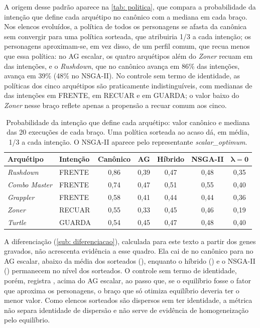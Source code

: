 A origem desse padrão aparece na \autoref{tab: politica}, que compara a probabilidade da intenção que define cada arquétipo no canônico com a mediana em cada braço. Nos elencos evoluídos, a política de todos os personagens se afasta da canônica sem convergir para uma política sorteada, que atribuiria 1/3 a cada intenção; os personagens aproximam-se, em vez disso, de um perfil comum, que recua menos que essa política: no AG escalar, os quatro arquétipos além do \textit{Zoner} recuam em \polAGRecuoOutros{} das intenções, e o \textit{Rushdown}, que no canônico avança em 86\% das intenções, avança em 39\% (48\% no NSGA-II). No controle sem termo de identidade, as políticas dos cinco arquétipos são praticamente indistinguíveis, com medianas de \polLzeroF{} das intenções em FRENTE, \polLzeroR{} em RECUAR e \polLzeroG{} em GUARDA; o valor baixo do \textit{Zoner} nesse braço reflete apenas a propensão a recuar comum aos cinco.

\begin{table}[htb]
    \caption[Probabilidade da intenção que define cada arquétipo]{Probabilidade da intenção que define cada arquétipo: valor canônico e mediana das 20 execuções de cada braço. Uma política sorteada ao acaso dá, em média, 1/3 a cada intenção. O NSGA-II aparece pelo representante \textit{scalar\_optimum}.}
    \label{tab: politica}
    \centering
    \small
    \begin{tabular}{l l c c c c c}
        \toprule
        \textbf{Arquétipo} & \textbf{Intenção} & \textbf{Canônico} & \textbf{AG} & \textbf{Híbrido} & \textbf{NSGA-II} & $\boldsymbol{\lambda = 0}$ \\
        \midrule
        \textit{Rushdown}     & FRENTE & 0,86 & 0,39 & 0,47 & 0,48 & 0,35 \\
        \textit{Combo Master} & FRENTE & 0,74 & 0,47 & 0,51 & 0,55 & 0,40 \\
        \textit{Grappler}     & FRENTE & 0,58 & 0,41 & 0,44 & 0,44 & 0,36 \\
        \textit{Zoner}        & RECUAR & 0,55 & 0,33 & 0,45 & 0,46 & 0,19 \\
        \textit{Turtle}       & GUARDA & 0,54 & 0,45 & 0,47 & 0,48 & 0,40 \\
        \bottomrule
    \end{tabular}
    \source
\end{table}

A diferenciação (\autoref{sub: diferenciacao}), calculada para este texto a partir dos genes gravados, não acrescenta evidência a esse quadro. Ela cai de \difCanon{} no canônico para \difAG{} no AG escalar, abaixo da média dos sorteados (\difAleat{}), enquanto o híbrido (\difHib{}) e o NSGA-II (\difNSGA{}) permanecem no nível dos sorteados. O controle sem termo de identidade, porém, registra \difLzero{}, acima do AG escalar, ao passo que, se o equilíbrio fosse o fator que aproxima os personagens, o braço que só otimiza equilíbrio deveria ter o menor valor. Como elencos sorteados são dispersos sem ter identidade, a métrica não separa identidade de dispersão e não serve de evidência de homogeneização pelo equilíbrio.


